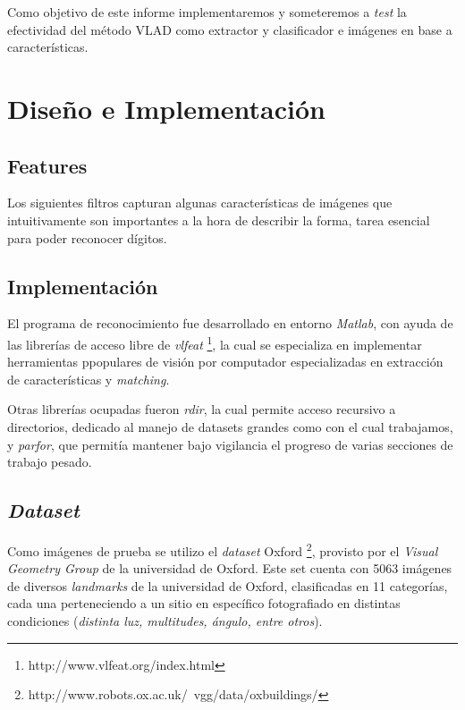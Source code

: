 Como objetivo de este informe implementaremos y someteremos a \emph{test} la efectividad del método VLAD como extractor y clasificador e imágenes en base a características.






\section{Diseño e Implementación}


\subsection{Features}
Los siguientes filtros capturan algunas características de imágenes que intuitivamente son importantes a la hora de describir la forma, tarea esencial para poder reconocer dígitos.






\subsection{Implementación}
El programa de reconocimiento fue desarrollado en entorno \emph{Matlab}, con ayuda de las librerías de acceso libre de \emph{vlfeat} \footnote{http://www.vlfeat.org/index.html}, la cual se especializa en implementar herramientas ppopulares de visión por computador especializadas en extracción de características y \emph{matching}.

Otras librerías ocupadas fueron \emph{rdir}, la cual permite acceso recursivo a directorios, dedicado al manejo de datasets grandes como con el cual trabajamos, y \emph{parfor}, que permitía mantener bajo vigilancia el progreso de varias secciones de trabajo pesado.



\subsection{\emph{Dataset}}
Como imágenes de prueba se utilizo el \emph{dataset} Oxford \footnote{http://www.robots.ox.ac.uk/~vgg/data/oxbuildings/}, provisto por el \emph{Visual Geometry Group} de la universidad de Oxford. Este set cuenta con 5063 imágenes de diversos \emph{landmarks} de la universidad de Oxford, clasificadas en 11 categorías, cada una perteneciendo a un sitio en específico fotografiado en distintas condiciones (\emph{distinta luz, multitudes, ángulo, entre otros}).

